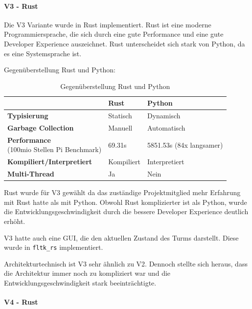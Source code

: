 \paragraph{V3 - Rust}
Die V3 Variante wurde in Rust implementiert. Rust ist eine moderne Programmiersprache, die sich durch eine gute Performance und eine gute Developer Experience auszeichnet. Rust unterscheidet sich stark von Python, da es eine Systemsprache ist.

Gegenüberstellung Rust und Python:
\begin{table}[ht]
  \begin{tabular}{l|l|l}
                                      & \textbf{Rust} & \textbf{Python}          \\
    \hline
    \textbf{Typisierung}              & Statisch      & Dynamisch                \\
    \textbf{Garbage Collection}       & Manuell       & Automatisch              \\
    \makecell[l]{\textbf{Performance }                                           \\(100mio Stellen Pi Benchmark\cite{programming_language_speeds})}
                                      & 69.31s        & 5851.53s (84x langsamer) \\
    \textbf{Kompiliert/Interpretiert} & Kompiliert    & Interpretiert            \\
    \textbf{Multi-Thread}             & Ja            & Nein                     \\
  \end{tabular}
  \caption{Gegenüberstellung Rust und Python}
  \label{tab:rust_vs_python}
\end{table}

Rust wurde für V3 gewählt da das zuständige Projektmitglied mehr Erfahrung mit Rust hatte als mit Python. Obwohl Rust komplizierter ist als Python, wurde die Entwicklungsgeschwindigkeit durch die bessere Developer Experience deutlich erhöht.

V3 hatte auch eine \ac{GUI}, die den aktuellen Zustand des Turms darstellt. Diese wurde in \texttt{fltk\_rs} implementiert.

Architekturtechnisch ist V3 sehr ähnlich zu V2. Dennoch stellte sich heraus, dass die Architektur immer noch zu kompliziert war und die Entwicklungsgeschwindigkeit stark beeinträchtigte.


\paragraph{V4 - Rust}

